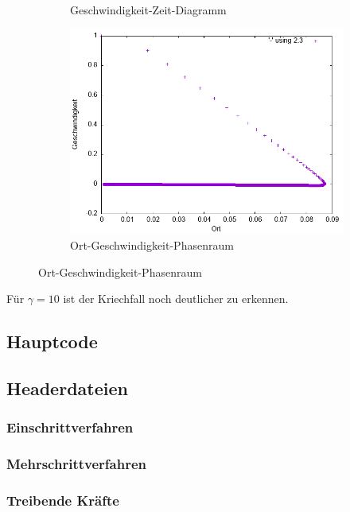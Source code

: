 \documentclass[
    oneside,
    ngerman,
    footinclude=false,
    captions=tableheading,
    DIV=12
]{scrartcl}
\begin{document}
\begin{figure}[H]
\begin{subfigure}[b]{0.45\textwidth}
                       \caption{Geschwindigkeit-Zeit-Diagramm}
                       \label{fig:VVA1(a)-001-10-v}
                   \end{subfigure}
                   \begin{subfigure}[b]{0.45\textwidth}
                       \centering
                       \includegraphics[width=\textwidth]{Bilddateien/VVA1(b)-001-10-xv.png}
                       \caption{Ort-Geschwindigkeit-Phasenraum}
                       \label{fig:VVA1(a)-001-10-xv}
                   \end{subfigure}
                \end{figure}
                Für $\gamma=10$ ist der Kriechfall noch deutlicher zu erkennen.

        \subaufgabe{}

        \subaufgabe{}
            

    \newpage
    \subsection*{Hauptcode}
        

    \subsection*{Headerdateien}
        \subsubsection*{Einschrittverfahren}
            

        \subsubsection*{Mehrschrittverfahren}
            

        \subsubsection*{Treibende Kräfte}
            
\end{document}
